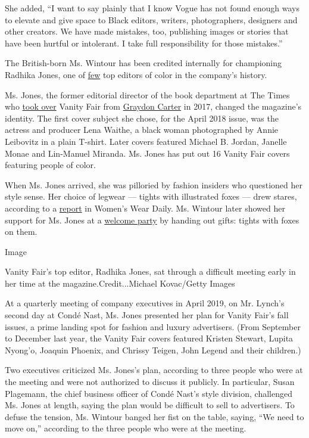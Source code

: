 She added, ``I want to say plainly that I know Vogue has not found
enough ways to elevate and give space to Black editors, writers,
photographers, designers and other creators. We have made mistakes, too,
publishing images or stories that have been hurtful or intolerant. I
take full responsibility for those mistakes.''

The British-born Ms. Wintour has been credited internally for
championing Radhika Jones, one of
\href{https://runway.blogs.nytimes3xbfgragh.onion/2012/10/04/african-american-chosen-as-editor-at-brides/}{few}
top editors of color in the company's history.

Ms. Jones, the former editorial director of the book department at The
Times who
\href{https://www.nytimes3xbfgragh.onion/2017/11/11/business/media/vanity-fair-editor.html}{took
over} Vanity Fair from
\href{https://www.nytimes3xbfgragh.onion/2017/09/07/business/media/graydon-carter-vanity-fair.html}{Graydon
Carter} in 2017, changed the magazine's identity. The first cover
subject she chose, for the April 2018 issue, was the actress and
producer Lena Waithe, a black woman photographed by Annie Leibovitz in a
plain T-shirt. Later covers featured Michael B. Jordan, Janelle Monae
and Lin-Manuel Miranda. Ms. Jones has put out 16 Vanity Fair covers
featuring people of color.

When Ms. Jones arrived, she was pilloried by fashion insiders who
questioned her style sense. Her choice of legwear --- tights with
illustrated foxes --- drew stares, according to a
\href{https://wwd.com/business-news/media/vanity-fair-fashion-staff-nonplussed-new-editor-personal-style-11051422/}{report}
in Women's Wear Daily. Ms. Wintour later showed her support for Ms.
Jones at a
\href{https://www.instagram.com/p/Bcs_iB3Fktr/?utm_source=ig_embed}{welcome
party} by handing out gifts: tights with foxes on them.

Image

Vanity Fair's top editor, Radhika Jones, sat through a difficult meeting
early in her time at the magazine.Credit...Michael Kovac/Getty Images

At a quarterly meeting of company executives in April 2019, on Mr.
Lynch's second day at Condé Nast, Ms. Jones presented her plan for
Vanity Fair's fall issues, a prime landing spot for fashion and luxury
advertisers. (From September to December last year, the Vanity Fair
covers featured Kristen Stewart, Lupita Nyong'o, Joaquin Phoenix, and
Chrissy Teigen, John Legend and their children.)

Two executives criticized Ms. Jones's plan, according to three people
who were at the meeting and were not authorized to discuss it publicly.
In particular, Susan Plagemann, the chief business officer of Condé
Nast's style division, challenged Ms. Jones at length, saying the plan
would be difficult to sell to advertisers. To defuse the tension, Ms.
Wintour banged her fist on the table, saying, ``We need to move on,''
according to the three people who were at the meeting.

